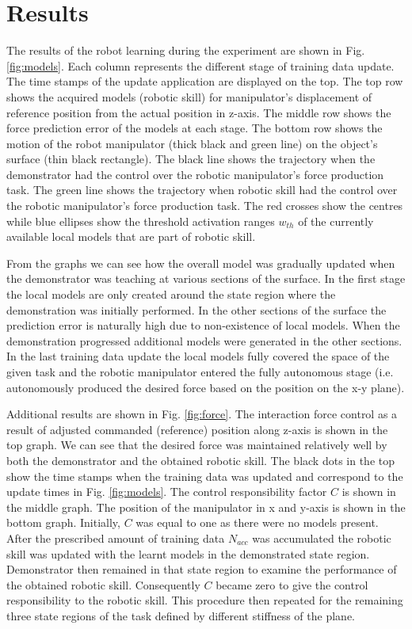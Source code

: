 \section{Results}
The results of the robot learning during the experiment are shown in Fig. \ref{fig:models}. Each column represents the different stage of training data update. The time stamps of the update application are displayed on the top. The top row shows the acquired models (robotic skill) for manipulator's displacement of reference position from the actual position in z-axis. The middle row shows the force prediction error of the models at each stage. The bottom row shows the motion of the robot manipulator (thick black and green line) on the object's surface (thin black rectangle). The black line shows the trajectory when the demonstrator had the control over the robotic manipulator's force production task. The green line shows the trajectory when robotic skill had the control over the robotic manipulator's force production task. The red crosses show the centres while blue ellipses show the threshold activation ranges $w_{th}$ of the currently available local models that are part of robotic skill.

From the graphs we can see how the overall model was gradually updated when the demonstrator was teaching at various sections of the surface. In the first stage the local models are only created around the state region where the demonstration was initially performed. In the other sections of the surface the prediction error is naturally high due to non-existence of local models. When the demonstration progressed additional models were generated in the other sections. In the last training data update the local models fully covered the space of the given task and the robotic manipulator entered the fully autonomous stage (i.e. autonomously produced the desired force based on the position on the x-y plane).

Additional results are shown in Fig. \ref{fig:force}. The interaction force control as a result of adjusted commanded (reference) position along z-axis is shown in the top graph. We can see that the desired force was maintained relatively well by both the demonstrator and the obtained robotic skill. The black dots in the top show the time stamps when the training data was updated and correspond to the update times in Fig. \ref{fig:models}. The control responsibility factor $C$ is shown in the middle graph. The position of the manipulator in x and y-axis is shown in the bottom graph. Initially, $C$ was equal to one as there were no models present. After the prescribed amount of training data $N_{acc}$ was accumulated the robotic skill was updated with the learnt models in the demonstrated state region. Demonstrator then remained in that state region to examine the performance of the obtained robotic skill. Consequently $C$ became zero to give the control responsibility to the robotic skill. This procedure then repeated for the remaining three state regions of the task defined by different stiffness of the plane.

